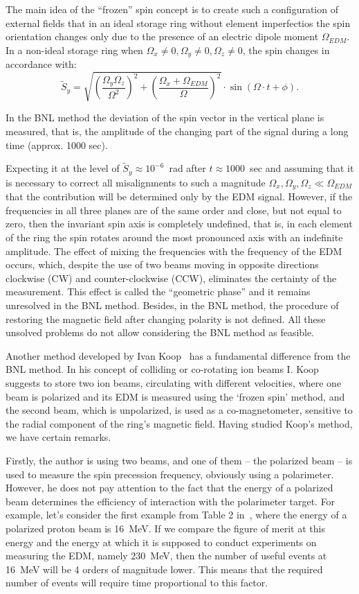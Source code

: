\documentclass[a4paper]{jpconf}
\newcommand{\W}{\Omega}
\begin{document}
The main idea of the ``frozen'' spin concept is to create such a configuration of external fields that in an ideal storage ring without element imperfectios the spin orientation changes only due to the presence of an electric dipole moment $\W_{EDM}$. 
In a non-ideal storage ring when $\W_x\neq0, \W_y\neq0, \W_z\neq0$, the spin changes in accordance with:
\begin{equation}\label{eq:Sy-oscillation}
	\tilde{S}_y = \sqrt{\left(\frac{\W_y\W_z}{\W^2}\right)^2 + \left(\frac{\W_x + \W_{EDM}}{\W}\right)^2}\cdot \sin(\W\cdot t + \phi).
\end{equation}

In the BNL method the deviation of the spin vector in the vertical plane is measured, that is, the amplitude of the changing part of the signal  during a long time (approx. 1000 sec). 

Expecting it at the level of $\tilde{S}_y\approx10^{-6}$~rad after $t\approx1000$~sec and assuming that it is necessary to correct all misalignments to such a magnitude $\W_x,\W_y, \W_z\ll\W_{EDM}$ that the contribution will be determined only by the EDM signal. However, if the frequencies in all three planes are of the same order and close, but not equal to zero, then the invariant spin axis is completely undefined, that is, in each element of the ring the spin rotates around the most pronounced axis with an indefinite amplitude. The effect of mixing the frequencies with the frequency of the EDM occurs, which, despite the use of two beams moving in opposite directions clockwise (CW) and counter-clockwise (CCW), eliminates the certainty of the measurement. This effect is called the ``geometric phase'' and it remains unresolved in the BNL method. Besides, in the BNL method, the procedure of restoring the magnetic field after changing polarity is not defined. All these unsolved problems do not allow considering the BNL method as feasible.

Another method developed by Ivan Koop~\cite{Koop2015} has a fundamental difference from the BNL method. In his concept of colliding or co-rotating ion beams I. Koop suggests to store two ion beams, circulating with different velocities, where one beam is polarized and its EDM is measured using the `frozen spin' method, and the second beam, which is unpolarized, is used as a co-magnetometer, sensitive to the radial component of the ring's magnetic field. Having studied Koop’s method, we have certain remarks. 

Firstly, the author is using two beams, and one of them -- the polarized beam -- is used to measure the spin precession frequency, obviously using a polarimeter. However, he does not pay attention to the fact that the energy of a polarized beam determines the efficiency of interaction with the polarimeter target. For example, let's consider the first example from Table 2 in~\cite{Koop2015}, where the energy of a polarized proton beam is 16~MeV. If we compare the figure of merit at this energy and the energy at which it is supposed to conduct experiments on measuring the EDM, namely 230~MeV, then the number of useful events at 16~MeV will be 4 orders of magnitude lower. This means that the required number of events will require time proportional to this factor.
\end{document}
